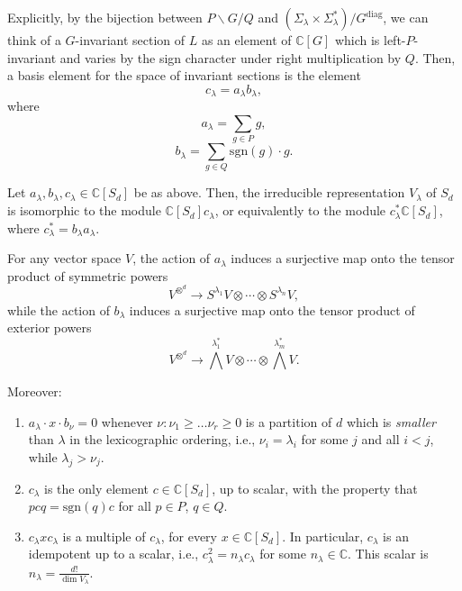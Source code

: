 Explicitly, by the bijection between $P\backslash G/Q$ and $(\Sigma_\lambda \times \Sigma_\lambda^*)/G^{\text{diag}}$, we can think of a $G$-invariant section of $L$ as an element of $\mathbb C[G]$ which is left-$P$-invariant and varies by the sign character under right multiplication by $Q$. Then, a basis element for the space of invariant sections is the element 
$$ c_\lambda = a_\lambda b_\lambda,$$
where 
$$ a_\lambda = \sum_{g\in P} g,$$
$$ b_\lambda = \sum_{g\in Q} \text{sgn}(g)\cdot g.$$


\begin{lemma}
\label{lemma-projectors}
Let $a_\lambda, b_\lambda, c_\lambda \in \mathbb C[S_d]$ be as above. Then, the irreducible representation $V_\lambda$ of $S_d$ is isomorphic to the module $\mathbb C[S_d] c_\lambda$, or equivalently to the module $c_\lambda^* \mathbb C[S_d]$, where $c_\lambda^*= b_\lambda a_\lambda$. 

For any vector space $V$, the action of $a_\lambda$ induces a surjective map onto the tensor product of symmetric powers
$$V^{\otimes^d} \to S^{\lambda_1}V \otimes \cdots \otimes S^{\lambda_n} V,$$
while the action of $b_\lambda$ induces a surjective map onto the tensor product of exterior powers
$$V^{\otimes^d} \to \bigwedge^{\lambda_1^*}V \otimes \cdots \otimes \bigwedge^{\lambda_m^*} V.$$

Moreover:
\begin{enumerate}
 \item $a_\lambda \cdot x \cdot b_\nu = 0$ whenever $\nu: \nu_1 \ge \dots \nu_r \ge 0$ is a partition of $d$ which is \emph{smaller} than $\lambda$ in the lexicographic ordering, i.e., $\nu_i = \lambda_i$ for some $j$ and all $i<j$, while $\lambda_j>\nu_j$. 
 \item $c_\lambda$ is the only element $c\in \mathbb C[S_d]$, up to scalar, with the property that $p c q = \text{sgn}(q) c$ for all $p\in P$, $q\in Q$. 
 \item $c_\lambda x c_\lambda$ is a multiple of $c_\lambda$, for every $x\in \mathbb C[S_d]$. In particular, $c_\lambda$ is an idempotent up to a scalar, i.e., $c_\lambda^2 = n_\lambda c_\lambda$ for some $n_\lambda\in \mathbb C$. This scalar is $n_\lambda = \frac{d!}{\dim V_\lambda}$.
\end{enumerate}

\end{lemma}


